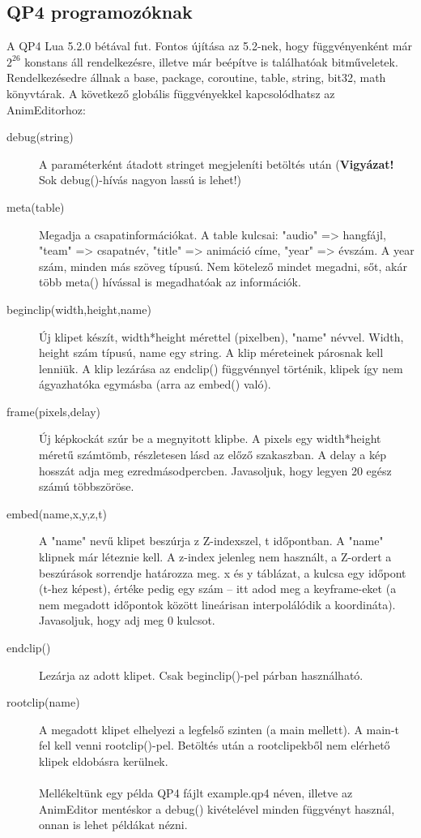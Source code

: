 \documentclass[a4paper,12pt,release]{article}
\begin{document}
\subsection{QP4 programozóknak}
A QP4 Lua 5.2.0 bétával fut. Fontos újítása az 5.2-nek, hogy függvényenként már $2^{26}$ konstans áll rendelkezésre, illetve már beépítve is találhatóak bitműveletek. Rendelkezésedre állnak a base, package, coroutine, table, string, bit32, math könyvtárak.
A következő globális függvényekkel kapcsolódhatsz az AnimEditorhoz:
\begin{description}
\item[debug(string)]A paraméterként átadott stringet megjeleníti betöltés után ({\bf Vigyázat!} Sok debug()-hívás nagyon lassú is lehet!)
\item[meta(table)]Megadja a csapatinformációkat. A table kulcsai: "audio" => hangfájl, "team" => csapatnév, "title" => animáció címe, "year" => évszám. A year szám, minden más szöveg típusú. Nem kötelező mindet megadni, sőt, akár több meta() hívással is megadhatóak az információk.
\item[beginclip(width,height,name)]Új klipet készít, width*height mérettel (pixelben), "name" névvel. Width, height szám típusú, name egy string. A klip méreteinek párosnak kell lenniük. A klip lezárása az endclip() függvénnyel történik, klipek így nem ágyazhatóka egymásba (arra az embed() való).
\item[frame(pixels,delay)]Új képkockát szúr be a megnyitott klipbe. A pixels egy width*height méretű számtömb, részletesen lásd az előző szakaszban. A delay a kép hosszát adja meg ezredmásodpercben. Javasoljuk, hogy legyen 20 egész számú többszöröse.
\item[embed(name,x,y,z,t)]A "name" nevű klipet beszúrja z Z-indexszel, t időpontban. A "name" klipnek már léteznie kell. A z-index jelenleg nem használt, a Z-ordert a beszúrások sorrendje határozza meg. x és y táblázat, a kulcsa egy időpont (t-hez képest), értéke pedig egy szám -- itt adod meg a keyframe-eket (a nem megadott időpontok között lineárisan interpolálódik a koordináta). Javasoljuk, hogy adj meg 0 kulcsot.
\item[endclip()]Lezárja az adott klipet. Csak beginclip()-pel párban használható.
\item[rootclip(name)]A megadott klipet elhelyezi a legfelső szinten (a main mellett). A main-t fel kell venni rootclip()-pel. Betöltés után a rootclipekből nem elérhető klipek eldobásra kerülnek.
\\\\
Mellékeltünk egy példa QP4 fájlt example.qp4 néven, illetve az AnimEditor mentéskor a debug() kivételével minden függvényt használ, onnan is lehet példákat nézni.
\end{description}
\end{document}
